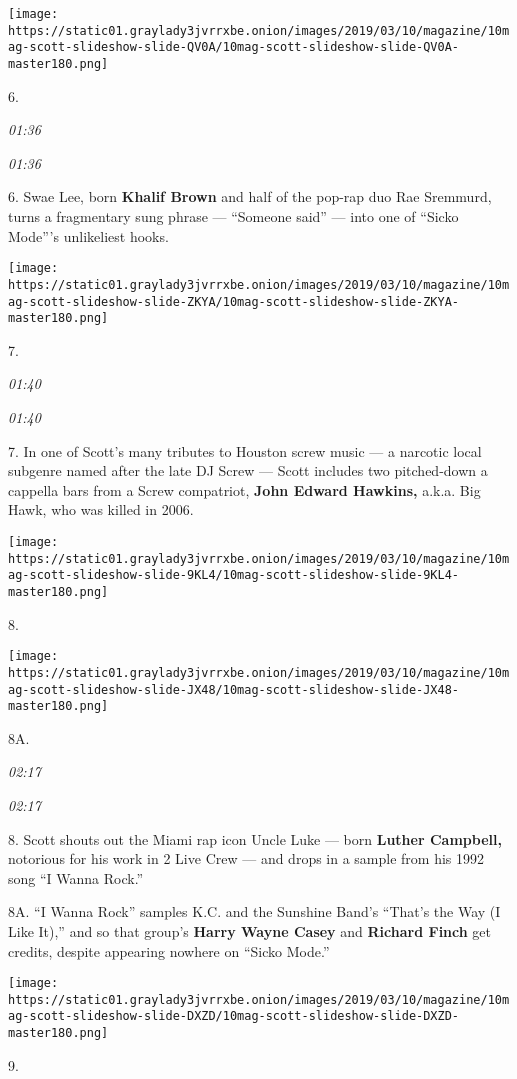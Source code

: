 \texttt{[image: https://static01.graylady3jvrrxbe.onion/images/2019/03/10/magazine/10mag-scott-slideshow-slide-QV0A/10mag-scott-slideshow-slide-QV0A-master180.png]}

6.

\emph{01:36}

\emph{01:36}

6. Swae Lee, born \textbf{Khalif Brown} and half of the pop-rap duo Rae
Sremmurd, turns a fragmentary sung phrase --- ``Someone said'' --- into
one of ``Sicko Mode'''s unlikeliest hooks.

\texttt{[image: https://static01.graylady3jvrrxbe.onion/images/2019/03/10/magazine/10mag-scott-slideshow-slide-ZKYA/10mag-scott-slideshow-slide-ZKYA-master180.png]}

7.

\emph{01:40}

\emph{01:40}

7. In one of Scott's many tributes to Houston screw music --- a narcotic
local subgenre named after the late DJ Screw --- Scott includes two
pitched-down a cappella bars from a Screw compatriot, \textbf{John
Edward Hawkins,} a.k.a. Big Hawk, who was killed in 2006.

\texttt{[image: https://static01.graylady3jvrrxbe.onion/images/2019/03/10/magazine/10mag-scott-slideshow-slide-9KL4/10mag-scott-slideshow-slide-9KL4-master180.png]}

8.

\texttt{[image: https://static01.graylady3jvrrxbe.onion/images/2019/03/10/magazine/10mag-scott-slideshow-slide-JX48/10mag-scott-slideshow-slide-JX48-master180.png]}

8A.

\emph{02:17}

\emph{02:17}

8. Scott shouts out the Miami rap icon Uncle Luke --- born
\textbf{Luther Campbell,} notorious for his work in 2 Live Crew --- and
drops in a sample from his 1992 song ``I Wanna Rock.''

8A. ``I Wanna Rock'' samples K.C. and the Sunshine Band's ``That's the
Way (I Like It),'' and so that group's \textbf{Harry Wayne Casey} and
\textbf{Richard Finch} get credits, despite appearing nowhere on ``Sicko
Mode.''

\texttt{[image: https://static01.graylady3jvrrxbe.onion/images/2019/03/10/magazine/10mag-scott-slideshow-slide-DXZD/10mag-scott-slideshow-slide-DXZD-master180.png]}

9.

